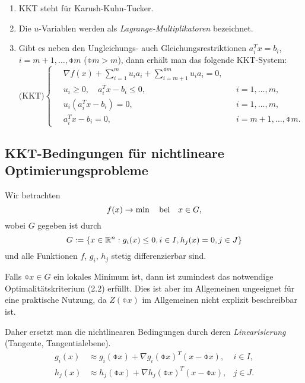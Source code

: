 \begin{rmrk*}
  \begin{enumerate}[(1)]
  \item KKT steht für Karush-Kuhn-Tucker.
  \item Die $u$-Variablen werden als \emph{Lagrange-Multiplikatoren} bezeichnet.
  \item Gibt es neben den Ungleichungs- auch Gleichungsrestriktionen $a_i^T x =
    b_i$, $i = m+1, \ldots, \obar{m}$ ($\obar{m} > m$), dann erhält man das
    folgende KKT-System:
    \begin{equation} %
      \text{(KKT)} \left\{ \quad \begin{aligned}
          \nabla f(x) + \sum_{i =1}^m u_i a_i + \sum_{i=m+1}^{\obar{m}} u_i a_i =
          0, & \\
          u_i \ge 0, \quad a_i^T x - b_i \le 0, & &i = 1, \ldots, m, \\
          u_i(a_i^T x - b_i) = 0, & &i = 1, \ldots, m, \\
          a_i^T x - b_i = 0, & &i = m + 1, \ldots, \obar{m}.
        \end{aligned} \right.
    \end{equation}
  \end{enumerate}
\end{rmrk*}

\subsection{KKT-Bedingungen für nichtlineare Optimierungsprobleme}
Wir betrachten
\begin{equation} %
  f(x) \to \min \subjto x \in G,
\end{equation}
wobei $G$ gegeben ist durch
\[ G := \{ x \in \mathbb{R}^n : g_i(x) \le 0, i \in I, h_j(x) = 0, j \in J \} \]
und alle Funktionen $f$, $g_i$, $h_j$  stetig differenzierbar sind.

Falls $\obar{x} \in G$ ein lokales Minimum ist, dann ist zumindest das
notwendige Optimalitätskriterium (2.2) erfüllt. Dies ist aber im Allgemeinen
ungeeignet für eine praktische Nutzung, da $Z(\obar{x})$ im Allgemeinen nicht
explizit beschreibbar ist.

Daher ersetzt man die nichtlinearen Bedingungen durch deren
\emph{Linearisierung} (Tangente, Tangentialebene).
\[ \begin{aligned}
    g_i(x) &\approx g_i(\obar{x}) + \nabla g_i(\obar{x})^T (x-\obar{x}),
    & i \in I, \\
    h_j(x) &\approx h_j(\obar{x}) + \nabla h_j(\obar{x})^T (x-\obar{x}),
    & j \in J.
  \end{aligned} \]

